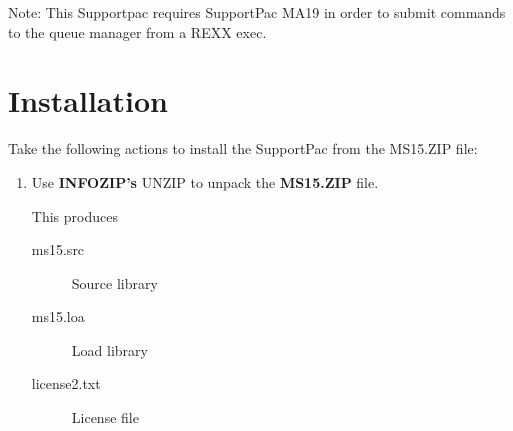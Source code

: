 \documentclass[a4paper,12pt]{report}
\begin{document}
Note: This Supportpac requires SupportPac MA19 in order to submit
commands to the queue manager from a REXX exec.

\section{Installation}
Take the following actions to install the SupportPac from the
MS15.ZIP file: 
\begin{enumerate}
\item
Use \textbf{INFOZIP's} UNZIP to unpack the \textbf{MS15.ZIP} file.

This produces
\begin{description}
\item [ms15.src] Source library
\item [ms15.loa] Load library
\item [license2.txt] License file
\end{description}


\end{enumerate}
\end{document}
